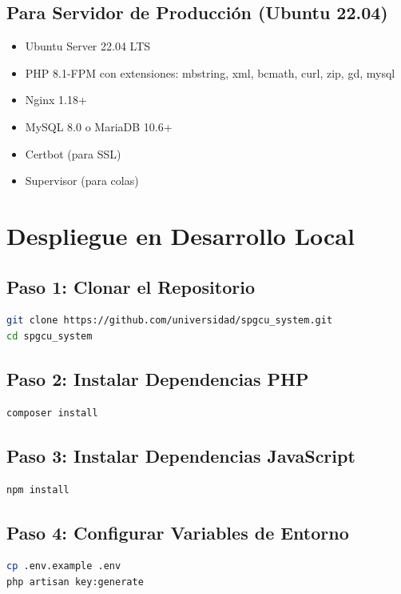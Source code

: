 \documentclass[12pt,a4paper]{article}
\begin{document}
\subsection{Para Servidor de Producción (Ubuntu 22.04)}
\begin{itemize}
    \item Ubuntu Server 22.04 LTS
    \item PHP 8.1-FPM con extensiones: mbstring, xml, bcmath, curl, zip, gd, mysql
    \item Nginx 1.18+
    \item MySQL 8.0 o MariaDB 10.6+
    \item Certbot (para SSL)
    \item Supervisor (para colas)
\end{itemize}

\section{Despliegue en Desarrollo Local}

\subsection{Paso 1: Clonar el Repositorio}
\begin{lstlisting}[language=bash]
git clone https://github.com/universidad/spgcu_system.git
cd spgcu_system
\end{lstlisting}

\subsection{Paso 2: Instalar Dependencias PHP}
\begin{lstlisting}[language=bash]
composer install
\end{lstlisting}

\subsection{Paso 3: Instalar Dependencias JavaScript}
\begin{lstlisting}[language=bash]
npm install
\end{lstlisting}

\subsection{Paso 4: Configurar Variables de Entorno}
\begin{lstlisting}[language=bash]
cp .env.example .env
php artisan key:generate
\end{lstlisting}
\end{document}

